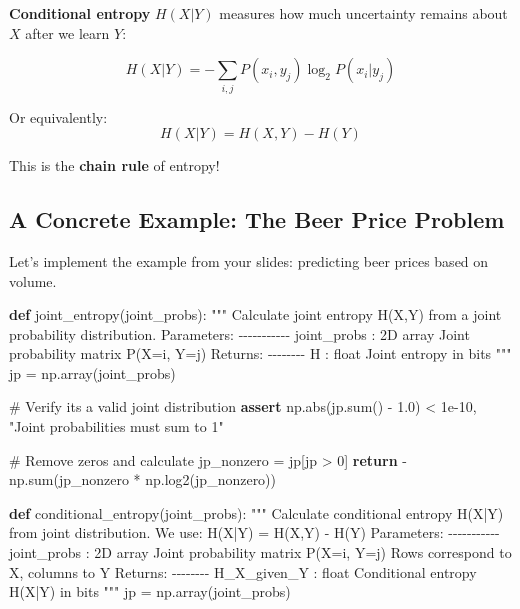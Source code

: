 \documentclass[
  11pt,
  letterpaper,
  oneside,
  openany]{book}
\newenvironment{Shaded}{\begin{snugshade}}{\end{snugshade}}
\newcommand{\BuiltInTok}[1]{\textcolor[rgb]{0.00,0.23,0.31}{#1}}
\newcommand{\CommentTok}[1]{\textcolor[rgb]{0.37,0.37,0.37}{#1}}
\newcommand{\ControlFlowTok}[1]{\textcolor[rgb]{0.00,0.23,0.31}{\textbf{#1}}}
\newcommand{\DecValTok}[1]{\textcolor[rgb]{0.68,0.00,0.00}{#1}}
\newcommand{\FloatTok}[1]{\textcolor[rgb]{0.68,0.00,0.00}{#1}}
\newcommand{\KeywordTok}[1]{\textcolor[rgb]{0.00,0.23,0.31}{\textbf{#1}}}
\newcommand{\NormalTok}[1]{\textcolor[rgb]{0.00,0.23,0.31}{#1}}
\newcommand{\OperatorTok}[1]{\textcolor[rgb]{0.37,0.37,0.37}{#1}}
\newcommand{\StringTok}[1]{\textcolor[rgb]{0.13,0.47,0.30}{#1}}
\begin{document}
\textbf{Conditional entropy} \(H(X|Y)\) measures how much uncertainty
remains about \(X\) after we learn \(Y\):

\[H(X|Y) = -\sum_{i,j} P(x_i, y_j) \log_2 P(x_i | y_j)\]

Or equivalently: \[H(X|Y) = H(X,Y) - H(Y)\]

This is the \textbf{chain rule} of entropy!

\subsection{A Concrete Example: The Beer Price
Problem}\label{a-concrete-example-the-beer-price-problem}

Let's implement the example from your slides: predicting beer prices
based on volume.

\begin{Shaded}
\begin{Highlighting}[]
\KeywordTok{def}\NormalTok{ joint\_entropy(joint\_probs):}
    \CommentTok{"""}
\CommentTok{    Calculate joint entropy H(X,Y) from a joint probability distribution.}
\CommentTok{    }
\CommentTok{    Parameters:}
\CommentTok{    {-}{-}{-}{-}{-}{-}{-}{-}{-}{-}{-}}
\CommentTok{    joint\_probs : 2D array}
\CommentTok{        Joint probability matrix P(X=i, Y=j)}
\CommentTok{        }
\CommentTok{    Returns:}
\CommentTok{    {-}{-}{-}{-}{-}{-}{-}{-}}
\CommentTok{    H : float}
\CommentTok{        Joint entropy in bits}
\CommentTok{    """}
\NormalTok{    jp }\OperatorTok{=}\NormalTok{ np.array(joint\_probs)}
    
    \CommentTok{\# Verify it\textquotesingle{}s a valid joint distribution}
    \ControlFlowTok{assert}\NormalTok{ np.}\BuiltInTok{abs}\NormalTok{(jp.}\BuiltInTok{sum}\NormalTok{() }\OperatorTok{{-}} \FloatTok{1.0}\NormalTok{) }\OperatorTok{\textless{}} \FloatTok{1e{-}10}\NormalTok{, }\StringTok{"Joint probabilities must sum to 1"}
    
    \CommentTok{\# Remove zeros and calculate}
\NormalTok{    jp\_nonzero }\OperatorTok{=}\NormalTok{ jp[jp }\OperatorTok{\textgreater{}} \DecValTok{0}\NormalTok{]}
    \ControlFlowTok{return} \OperatorTok{{-}}\NormalTok{np.}\BuiltInTok{sum}\NormalTok{(jp\_nonzero }\OperatorTok{*}\NormalTok{ np.log2(jp\_nonzero))}


\KeywordTok{def}\NormalTok{ conditional\_entropy(joint\_probs):}
    \CommentTok{"""}
\CommentTok{    Calculate conditional entropy H(X|Y) from joint distribution.}
\CommentTok{    }
\CommentTok{    We use: H(X|Y) = H(X,Y) {-} H(Y)}
\CommentTok{    }
\CommentTok{    Parameters:}
\CommentTok{    {-}{-}{-}{-}{-}{-}{-}{-}{-}{-}{-}}
\CommentTok{    joint\_probs : 2D array}
\CommentTok{        Joint probability matrix P(X=i, Y=j)}
\CommentTok{        Rows correspond to X, columns to Y}
\CommentTok{        }
\CommentTok{    Returns:}
\CommentTok{    {-}{-}{-}{-}{-}{-}{-}{-}}
\CommentTok{    H\_X\_given\_Y : float}
\CommentTok{        Conditional entropy H(X|Y) in bits}
\CommentTok{    """}
\NormalTok{    jp }\OperatorTok{=}\NormalTok{ np.array(joint\_probs)}
    

\end{Highlighting}
\end{Shaded}
\end{document}
